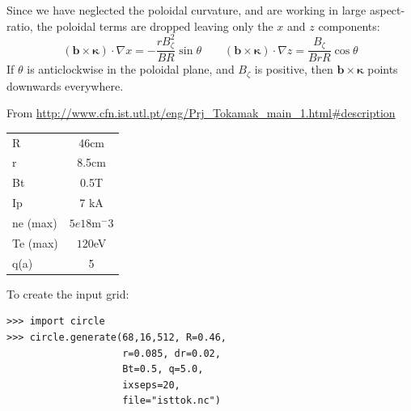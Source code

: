 \documentclass[12pt,a4paper]{article}
\begin{document}
Since we have neglected the poloidal curvature, and are working in large aspect-ratio, the poloidal terms are dropped leaving
only the $x$ and $z$ components:
\begin{equation}
  \left(\mathbf{b}\times\mathbf{\kappa}\right)\cdot\nabla x = -\frac{rB_\zeta^2}{BR}\sin\theta \qquad \left(\mathbf{b}\times\mathbf{\kappa}\right)\cdot\nabla z = \frac{B_\zeta}{BrR}\cos\theta
\end{equation}
If $\theta$ is anticlockwise in the poloidal plane, and $B_\zeta$ is positive, then $\mathbf{b}\times\mathbf{\kappa}$ points
downwards everywhere.


From \url{http://www.cfn.ist.utl.pt/eng/Prj_Tokamak_main_1.html#description}

\begin{tabular}{l c}
R  & 46cm \\
r  &  8.5cm \\
Bt & 0.5T \\
Ip & 7 kA \\
ne (max) & $5e18$m$^-3$ \\
Te (max) & $120$eV \\
q(a) & 5 \\
\end{tabular}

To create the input grid:

\begin{verbatim}
>>> import circle
>>> circle.generate(68,16,512, R=0.46, 
                    r=0.085, dr=0.02, 
                    Bt=0.5, q=5.0, 
                    ixseps=20, 
                    file="isttok.nc")
\end{verbatim}
\end{document}
